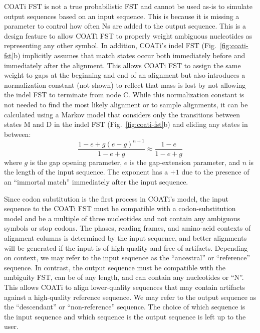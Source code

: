 \documentclass[12pt,letterpaper]{article}
\begin{document}
COATi FST is not a true probabilistic FST \citep{cotterell-etal-2014-stochastic} and cannot be used as-is to simulate output sequences based on an input sequence. This is because it is missing a parameter to control how often Ns are added to the output sequence. This is a design feature to allow COATi FST to properly weight ambiguous nucleotides as representing any other symbol. In addition, COATi's indel FST (Fig.~\ref{fig:coati-fst}b) implicitly assumes that match states occur both immediately before and immediately after the alignment. This allows COATi FST to assign the same weight to gaps at the beginning and end of an alignment but also introduces a normalization constant (not shown) to reflect that mass is lost by not allowing the indel FST to terminate from node C. While this normalization constant is not needed to find the most likely alignment or to sample alignments, it can be calculated using a Markov model that considers only the transitions between states M and D in the indel FST (Fig.~\ref{fig:coati-fst}b) and eliding any states in between:
\[
\frac{1-e + g(e-g)^{n+1}}{1-e+g} \approx \frac{1-e}{1-e+g} 
\]
where $g$ is the gap opening parameter, $e$ is the gap-extension parameter, and $n$ is the length of the input sequence. The exponent has a $+1$ due to the presence of an ``immortal match'' immediately after the input sequence.

Since codon substitution is the first process in COATi's model, the input sequence to the COATi FST must be compatible with a codon-substitution model and be a multiple of three nucleotides and not contain any ambiguous symbols or stop codons. The phases, reading frames, and amino-acid contexts of alignment columns is determined by the input sequence, and better alignments will be generated if the input is of high quality and free of artifacts. Depending on context, we may refer to the input sequence as the ``ancestral'' or ``reference'' sequence. In contrast, the output sequence must be compatible with the ambiguity FST, can be of any length, and can contain any nucleotides or ``N''. This allows COATi to align lower-quality sequences that may contain artifacts against a high-quality reference sequence. We may refer to the output sequence as the ``descendant'' or ``non-reference'' sequence. The choice of which sequence is the input sequence and which sequence is the output sequence is left up to the user.
\end{document}

